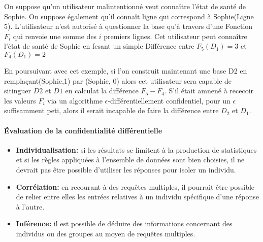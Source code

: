 On suppose qu'un utilisateur malintentionné veut connaître l'état de santé de Sophie. On suppose également qu'il connaît ligne qui correspond à Sophie(Ligne 5). L'utilisateur n'est autorisé à questionner la base qu'à travers d'une Fonction \begin{math}F_{i}\end{math} qui renvoie une somme des \begin{math}i\end{math} premiers lignes. Cet utilisateur peut connaître l'état de santé de Sophie en fesant un simple Différence entre \begin{math}F_{5}(D_{1}) = 3\end{math} et \begin{math}F_{4}(D_{1}) = 2\end{math}

En poursuivant avec cet exemple, si l'on construit maintenant une base D2 en remplaçant(Sophie,1) par (Sophie, 0) alors cet utilisateur sera capable de sitinguer \begin{math}D2\end{math} et \begin{math}D1\end{math} en calculat la différence \begin{math}F_{5} - F_{4}\end{math}. S'il était amnené à rececoir les valeurs \begin{math}F_{i}\end{math} via un algorithme \begin{math}\epsilon\end{math}-différentiellement confidentiel, pour un \begin{math}\epsilon\end{math} suffisamment peti, alors il serait incapable de faire la différence entre \begin{math}D_{2}\end{math} et \begin{math}D_{1}\end{math}.

\paragraph{Évaluation de la confidentialité différentielle}
\begin{itemize}
    \item \textbf{Individualisation:} si les résultats se limitent à la production de statistiques et si les règles appliquées à l’ensemble de données sont bien choisies, il ne devrait pas être possible d’utiliser les réponses pour isoler un individu. 

    \item \textbf{Corrélation:} en recourant à des requêtes multiples, il pourrait être possible de relier entre elles les entrées relatives à un individu spécifique d’une réponse à l’autre. 

    \item \textbf{Inférence:} il est possible de déduire des informations concernant des individus ou des groupes au moyen de requêtes multiples. 
\end{itemize}